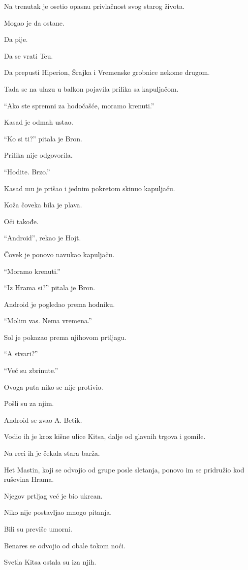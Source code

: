 Na trenutak je osetio opasnu privlačnost svog starog života.

Mogao je da ostane.

Da pije.

Da se vrati Teu.

Da prepusti Hiperion, Šrajka i Vremenske grobnice nekome drugom.

Tada se na ulazu u balkon pojavila prilika sa kapuljačom.

``Ako ste spremni za hodočašće, moramo krenuti.''

Kasad je odmah ustao.

``Ko si ti?'' pitala je Bron.

Prilika nije odgovorila.

``Hodite. Brzo.''

Kasad mu je prišao i jednim pokretom skinuo kapuljaču.

Koža čoveka bila je plava.

Oči takođe.

``Android'', rekao je Hojt.

Čovek je ponovo navukao kapuljaču.

``Moramo krenuti.''

``Iz Hrama si?'' pitala je Bron.

Android je pogledao prema hodniku.

``Molim vas. Nema vremena.''

Sol je pokazao prema njihovom prtljagu.

``A stvari?''

``Već su zbrinute.''

Ovoga puta niko se nije protivio.

Pošli su za njim.

\bigskip

Android se zvao A. Betik.

Vodio ih je kroz kišne ulice Kitsa, dalje od glavnih trgova i gomile.

Na reci ih je čekala stara barža.

Het Mastin, koji se odvojio od grupe posle sletanja, ponovo im se pridružio kod ruševina Hrama.

Njegov prtljag već je bio ukrcan.

Niko nije postavljao mnogo pitanja.

Bili su previše umorni.

Benares se odvojio od obale tokom noći.

Svetla Kitsa ostala su iza njih.

